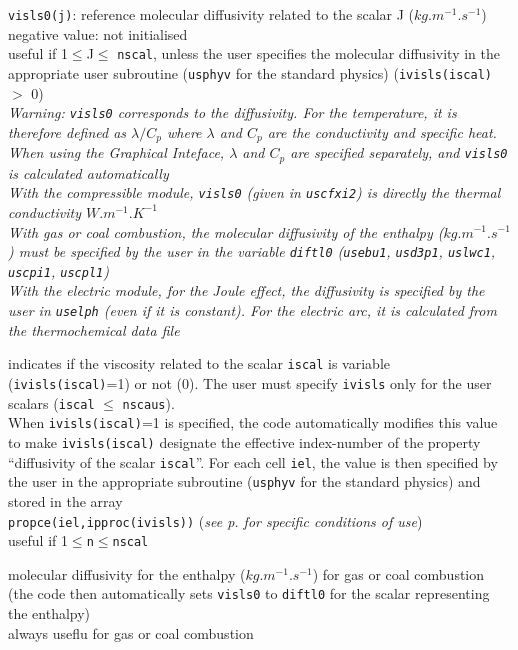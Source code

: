 {{\tt visls0(j)}: reference molecular diffusivity related to the scalar J
($kg.m^{-1}.s^{-1}$)\\
negative value: not initialised\\
useful if 1$\leqslant$J$\leqslant$ {\tt nscal}, unless the user specifies the
molecular diffusivity in the appropriate user subroutine (\texttt{usphyv} for
the standard physics) ({\tt ivisls(iscal)} $>$ 0)\\
{\em Warning: {\tt visls0} corresponds to the diffusivity. For the temperature, it is
therefore defined as $\lambda/C_p$ where $\lambda$ and $C_p$ are the
conductivity and specific heat. When using the Graphical Inteface, $\lambda$ and
$C_p$ are specified separately, and {\tt visls0} is calculated automatically\\
With the compressible module, {\tt visls0} (given in \texttt{uscfxi2}) is directly the
thermal conductivity $W.m^{-1}.K^{-1}$\\
With gas or coal combustion, the molecular diffusivity of the enthalpy
($kg.m^{-1}.s^{-1}$) must be specified by the user in the variable {\tt diftl0}
(\texttt{usebu1}, \texttt{usd3p1}, \texttt{uslwc1}, \texttt{uscpi1}, \texttt{uscpl1})\\
With the electric module, for the Joule effect, the diffusivity is specified by
the user in \texttt{uselph} (even if it is constant). For the electric arc, it
is calculated from the thermochemical data file}}

{indicates if the viscosity related to the scalar {\tt iscal} is variable
({\tt ivisls(iscal)}=1) or not (0). The user must specify {\tt ivisls} only for the
user scalars ({\tt iscal} $\leqslant$ {\tt nscaus}).\\
When {\tt ivisls(iscal)}=1 is specified, the code automatically modifies this value to
make {\tt ivisls(iscal)} designate the effective index-number of the property
``diffusivity of the scalar {\tt iscal}''. For each cell {\tt iel}, the value
is then specified by the user in the appropriate subroutine
(\texttt{usphyv} for the standard physics) and stored in the array\\
{\tt propce(iel,ipproc(ivisls))}
({\em see p.\pageref{prg_propvar} for specific conditions of use})\\
useful if 1$\leqslant${\tt n}$\leqslant${\tt nscal}}


{molecular diffusivity for the enthalpy ($kg.m^{-1}.s^{-1}$) for gas or coal
combustion (the code then automatically sets {\tt visls0} to {\tt diftl0} for the scalar
representing the enthalpy)\\
always useflu for gas or coal combustion}

